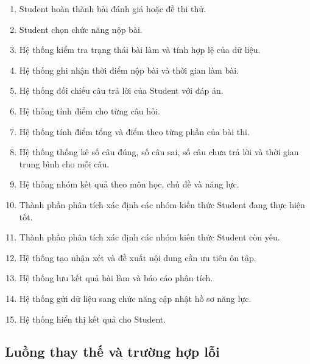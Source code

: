 \begin{enumerate}
	\item Student hoàn thành bài đánh giá hoặc đề thi thử.
	
	\item Student chọn chức năng nộp bài.
	
	\item Hệ thống kiểm tra trạng thái bài làm và tính hợp lệ của dữ liệu.
	
	\item Hệ thống ghi nhận thời điểm nộp bài và thời gian làm bài.
	
	\item Hệ thống đối chiếu câu trả lời của Student với đáp án.
	
	\item Hệ thống tính điểm cho từng câu hỏi.
	
	\item Hệ thống tính điểm tổng và điểm theo từng phần của bài thi.
	
	\item Hệ thống thống kê số câu đúng, số câu sai, số câu chưa trả lời
	và thời gian trung bình cho mỗi câu.
	
	\item Hệ thống nhóm kết quả theo môn học, chủ đề và năng lực.
	
	\item Thành phần phân tích xác định các nhóm kiến thức Student đang
	thực hiện tốt.
	
	\item Thành phần phân tích xác định các nhóm kiến thức Student còn yếu.
	
	\item Hệ thống tạo nhận xét và đề xuất nội dung cần ưu tiên ôn tập.
	
	\item Hệ thống lưu kết quả bài làm và báo cáo phân tích.
	
	\item Hệ thống gửi dữ liệu sang chức năng cập nhật hồ sơ năng lực.
	
	\item Hệ thống hiển thị kết quả cho Student.
\end{enumerate}

\subsection{Luồng thay thế và trường hợp lỗi}

